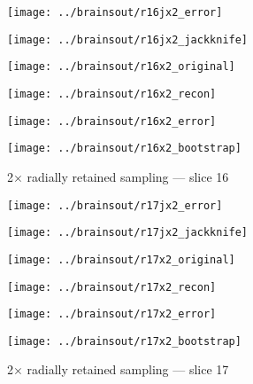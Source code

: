 \documentclass[review,supplement,onefignum,onetabnum,juq]{siamonline181217}
\begin{document}
\begin{figure}
\begin{centering}

\parbox{\imsize}{\texttt{[image: ../brainsout/r16jx2\_error]}}
\parbox{\imsize}{\texttt{[image: ../brainsout/r16jx2\_jackknife]}}

\vspace{\vertsep}

\parbox{\imsize}{\texttt{[image: ../brainsout/r16x2\_original]}}
\parbox{\imsize}{\texttt{[image: ../brainsout/r16x2\_recon]}}

\vspace{\vertsep}

\parbox{\imsize}{\texttt{[image: ../brainsout/r16x2\_error]}}
\parbox{\imsize}{\texttt{[image: ../brainsout/r16x2\_bootstrap]}}

\end{centering}
\caption{2$\times$ radially retained sampling --- slice 16}
\end{figure}


\begin{figure}
\begin{centering}

\parbox{\imsize}{\texttt{[image: ../brainsout/r17jx2\_error]}}
\parbox{\imsize}{\texttt{[image: ../brainsout/r17jx2\_jackknife]}}

\vspace{\vertsep}

\parbox{\imsize}{\texttt{[image: ../brainsout/r17x2\_original]}}
\parbox{\imsize}{\texttt{[image: ../brainsout/r17x2\_recon]}}

\vspace{\vertsep}

\parbox{\imsize}{\texttt{[image: ../brainsout/r17x2\_error]}}
\parbox{\imsize}{\texttt{[image: ../brainsout/r17x2\_bootstrap]}}

\end{centering}
\caption{2$\times$ radially retained sampling --- slice 17}
\end{figure}
\end{document}
